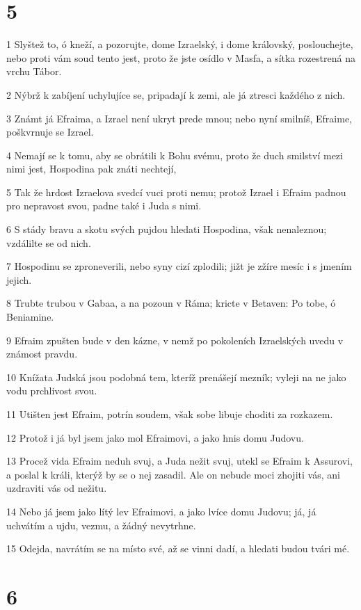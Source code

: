 \chapter{5}

\par 1 Slyštež to, ó kneží, a pozorujte, dome Izraelský, i dome královský, poslouchejte, nebo proti vám soud tento jest, proto že jste osídlo v Masfa, a sítka rozestrená na vrchu Tábor.
\par 2 Nýbrž k zabíjení uchylujíce se, pripadají k zemi, ale já ztresci každého z nich.
\par 3 Známt já Efraima, a Izrael není ukryt prede mnou; nebo nyní smilníš, Efraime, poškvrnuje se Izrael.
\par 4 Nemají se k tomu, aby se obrátili k Bohu svému, proto že duch smilství mezi nimi jest, Hospodina pak znáti nechtejí,
\par 5 Tak že hrdost Izraelova svedcí vuci proti nemu; protož Izrael i Efraim padnou pro nepravost svou, padne také i Juda s nimi.
\par 6 S stády bravu a skotu svých pujdou hledati Hospodina, však nenaleznou; vzdálilte se od nich.
\par 7 Hospodinu se zproneverili, nebo syny cizí zplodili; jižt je zžíre mesíc i s jmením jejich.
\par 8 Trubte trubou v Gabaa, a na pozoun v Ráma; kricte v Betaven: Po tobe, ó Beniamine.
\par 9 Efraim zpušten bude v den kázne, v nemž po pokoleních Izraelských uvedu v známost pravdu.
\par 10 Knížata Judská jsou podobná tem, kteríž prenášejí mezník; vyleji na ne jako vodu prchlivost svou.
\par 11 Utišten jest Efraim, potrín soudem, však sobe libuje choditi za rozkazem.
\par 12 Protož i já byl jsem jako mol Efraimovi, a jako hnis domu Judovu.
\par 13 Procež vida Efraim neduh svuj, a Juda nežit svuj, utekl se Efraim k Assurovi, a poslal k králi, kterýž by se o nej zasadil. Ale on nebude moci zhojiti vás, ani uzdraviti vás od nežitu.
\par 14 Nebo já jsem jako lítý lev Efraimovi, a jako lvíce domu Judovu; já, já uchvátím a ujdu, vezmu, a žádný nevytrhne.
\par 15 Odejda, navrátím se na místo své, až se vinni dadí, a hledati budou tvári mé.

\chapter{6}

